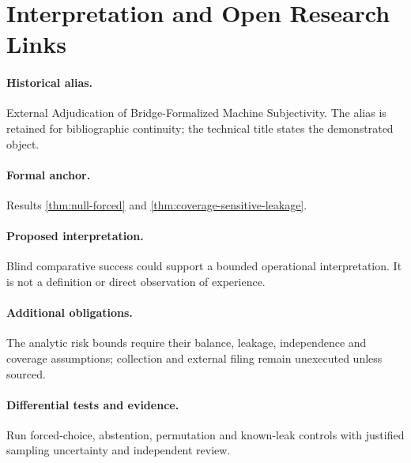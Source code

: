 \documentclass[11pt,a4paper]{article}
\begin{document}
\section{Interpretation and Open Research Links}\label{sec:interpretation-open-links}
\paragraph{Historical alias.} External Adjudication of Bridge-Formalized Machine Subjectivity. The alias is retained for bibliographic continuity; the technical title states the demonstrated object.

\paragraph{Formal anchor.} Results \ref{thm:null-forced} and \ref{thm:coverage-sensitive-leakage}.

\paragraph{Proposed interpretation.} Blind comparative success could support a bounded operational interpretation. It is not a definition or direct observation of experience.

\paragraph{Additional obligations.} The analytic risk bounds require their balance, leakage, independence and coverage assumptions; collection and external filing remain unexecuted unless sourced.

\paragraph{Differential tests and evidence.} Run forced-choice, abstention, permutation and known-leak controls with justified sampling uncertainty and independent review.



\appendix
\clearpage
\end{document}
